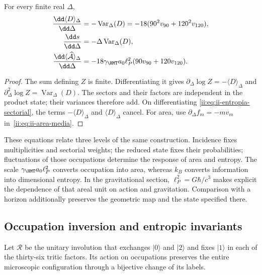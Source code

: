 \begin{proposition}
For every finite real $\Delta$,
\begin{align}
 \frac{\dd\langle D\rangle_\Delta}{\dd\Delta}
 &=-\operatorname{Var}_\Delta(D)
   =-18(90^2v_{90}+120^2v_{120}),\\
 \frac{\dd s}{\dd\Delta}
 &=-\Delta\operatorname{Var}_\Delta(D),
 \label{ii:eq:ii-respuesta-entropica}\\
 \frac{\dd\langle\widehat{\mathcal A}\rangle_\Delta}{\dd\Delta}
 &=-18\gamma_{\HMT}a_0\ell_P^2(90v_{90}+120v_{120}).
 \label{ii:eq:ii-respuesta-areal}
\end{align}
\end{proposition}
\begin{proof}
The sum defining $Z$ is finite. Differentiating it gives
$\partial_\Delta\log Z=-\langle D\rangle_\Delta$ and
$\partial_\Delta^2\log Z=\operatorname{Var}_\Delta(D)$.
The sectors and their factors are independent in the product state;
their variances therefore add. On differentiating
\eqref{ii:eq:ii-entropia-sectorial}, the terms
$-\langle D\rangle_\Delta$ and $\langle D\rangle_\Delta$
cancel. For area, use
$\partial_\Delta f_m=-mv_m$ in~\eqref{ii:eq:ii-area-media}.
\end{proof}

These equations relate three levels of the same construction.
Incidence fixes multiplicities and sectorial weights; the
reduced state fixes their probabilities; fluctuations of those
occupations determine the response of area and entropy.
The scale $\gamma_{\HMT}a_0\ell_P^2$ converts occupation into area,
whereas $k_B$ converts information into dimensional entropy.
In the gravitational section, $\ell_P^2=G\hbar/c^3$ makes explicit
the dependence of that areal unit on action and gravitation.
Comparison with a horizon additionally preserves the geometric
map and the state specified there.

\subsection{Occupation inversion and entropic invariants}
\label{ii:sec:ii-inversion-sectorial}

Let $\mathcal R$ be the unitary involution that exchanges $|0\rangle$
and $|2\rangle$ and fixes $|1\rangle$ in each of the thirty-six
tritic factors. Its action on occupations preserves the entire
microscopic configuration through a bijective change of its labels.

